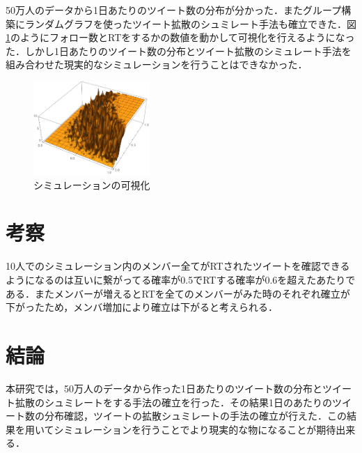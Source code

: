 \documentclass[uplatex,twocolumn,dvipdfmx]{jsarticle}
\begin{document}
50万人のデータから1日あたりのツイート数の分布が分かった．またグループ構築にランダムグラフを使ったツイート拡散のシュミレート手法も確立できた．図\ref{何人がRTを見るか}のようにフォロー数とRTをするかの数値を動かして可視化を行えるようになった．しかし1日あたりのツイート数の分布とツイート拡散のシミュレート手法を組み合わせた現実的なシミュレーションを行うことはできなかった．

\begin{figure}[htb]
\centering
\includegraphics[width=44mm,clip]{result.pdf}
\caption{シミュレーションの可視化}\label{何人がRTを見るか}
\end{figure}

\section{考察}

10人でのシミュレーション内のメンバー全てがRTされたツイートを確認できるようになるのは互いに繋がってる確率が0.5でRTする確率が0.6を超えたあたりである．またメンバーが増えるとRTを全てのメンバーがみた時のそれぞれ確立が下がったため，メンバ増加により確立は下がると考えられる．

\section{結論}

本研究では，50万人のデータから作った1日あたりのツイート数の分布とツイート拡散のシュミレートをする手法の確立を行った．その結果1日のあたりのツイート数の分布確認，ツイートの拡散シュミレートの手法の確立が行えた．この結果を用いてシミュレーションを行うことでより現実的な物になることが期待出来る．


\end{document}
